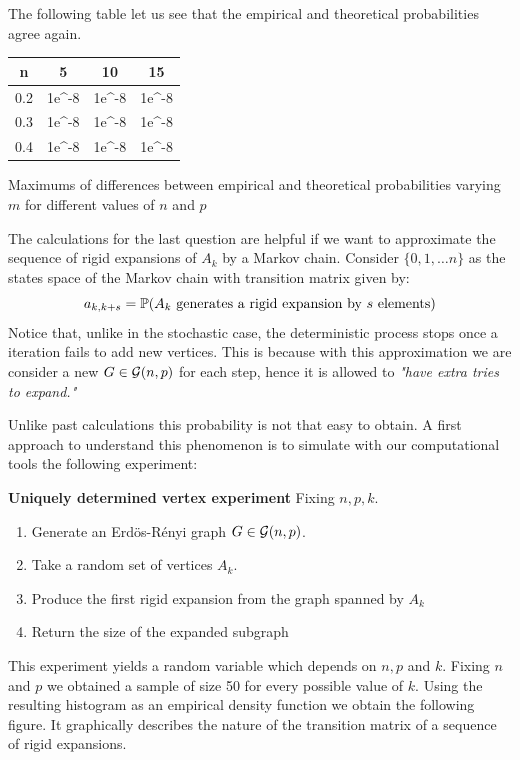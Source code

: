 The following table let us see that the empirical and theoretical probabilities agree again.

\bgroup
\def\arraystretch{1.5}%
\begin{center}
\begin{tabular}{|c|c|c|c|}
\hline
n & 5 & 10 & 15 \\
\hline \hline
 0.2 & 1e^{-8} & 1e^{-8} & 1e^{-8} \\\hline
 0.3 & 1e^{-8} & 1e^{-8} & 1e^{-8} \\\hline
 0.4 & 1e^{-8} & 1e^{-8} & 1e^{-8} \\\hline
\end{tabular}
\caption{Maximums of differences between empirical and theoretical probabilities varying $m$ for different values of $n$ and $p$}
\label{tabla:sencilla}
\end{center}
\bgroup

The calculations for the last question are helpful if we want to approximate the sequence of rigid expansions of $A_{k}$ by a Markov chain. Consider $\{0,1, \dots n\}$ as the states space of the Markov chain with transition matrix given by:
$$ a_{k,k+s} = \P(A_{k} \text{ generates a rigid expansion by } s \text{ elements})$$
Notice that, unlike in the stochastic case, the deterministic process stops once a iteration fails to add new vertices. This is because with this approximation we are consider a new $G \in \G(n,p)$ for each step, hence it is allowed to \textit{"have extra tries to expand."}

Unlike past calculations this probability is not that easy to obtain. A first approach to understand this phenomenon is to simulate with our computational tools the following experiment:
 
\begin{cajita}
\textbf{Uniquely determined vertex experiment} \hfill \break
Fixing $n,p,k$.
\begin{enumerate}
\item Generate an Erdös-Rényi graph $G\in \G(n,p)$.
\item Take a random set of vertices $A_{k}$.
\item Produce the first rigid expansion from the graph spanned by $A_{k}$
\item Return the size of the expanded subgraph
\end{enumerate}
\end{cajita}

This experiment yields a random variable which depends on $n, p$ and $k$. Fixing $n$ and $p$ we obtained a sample of size 50 for every possible value of $k$. Using the resulting histogram as an empirical density function we obtain the following figure. It graphically describes the nature of the transition matrix of a sequence of rigid expansions.

